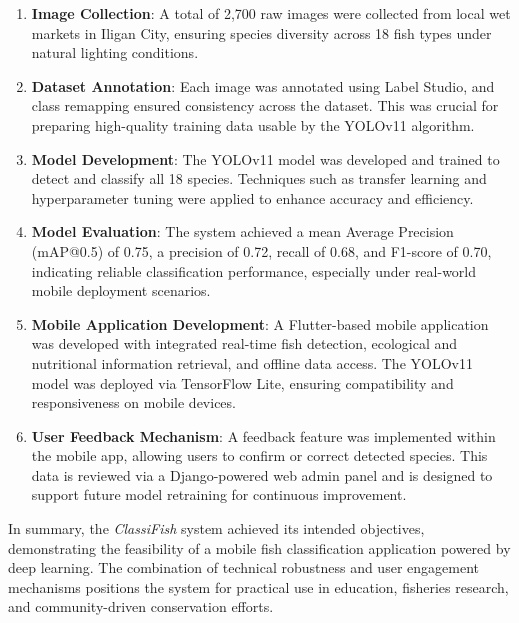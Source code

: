 \begin{enumerate}
    \item \textbf{Image Collection}: A total of 2,700 raw images were collected from local wet markets in Iligan City, ensuring species diversity across 18 fish types under natural lighting conditions.

    \item \textbf{Dataset Annotation}: Each image was annotated using Label Studio, and class remapping ensured consistency across the dataset. This was crucial for preparing high-quality training data usable by the YOLOv11 algorithm.

    \item \textbf{Model Development}: The YOLOv11 model was developed and trained to detect and classify all 18 species. Techniques such as transfer learning and hyperparameter tuning were applied to enhance accuracy and efficiency.

    \item \textbf{Model Evaluation}: The system achieved a mean Average Precision (mAP@0.5) of 0.75, a precision of 0.72, recall of 0.68, and F1-score of 0.70, indicating reliable classification performance, especially under real-world mobile deployment scenarios.

    \item \textbf{Mobile Application Development}: A Flutter-based mobile application was developed with integrated real-time fish detection, ecological and nutritional information retrieval, and offline data access. The YOLOv11 model was deployed via TensorFlow Lite, ensuring compatibility and responsiveness on mobile devices.

    \item \textbf{User Feedback Mechanism}: A feedback feature was implemented within the mobile app, allowing users to confirm or correct detected species. This data is reviewed via a Django-powered web admin panel and is designed to support future model retraining for continuous improvement.
\end{enumerate}

In summary, the \textit{ClassiFish} system achieved its intended objectives, demonstrating the feasibility of a mobile fish classification application powered by deep learning. The combination of technical robustness and user engagement mechanisms positions the system for practical use in education, fisheries research, and community-driven conservation efforts.
